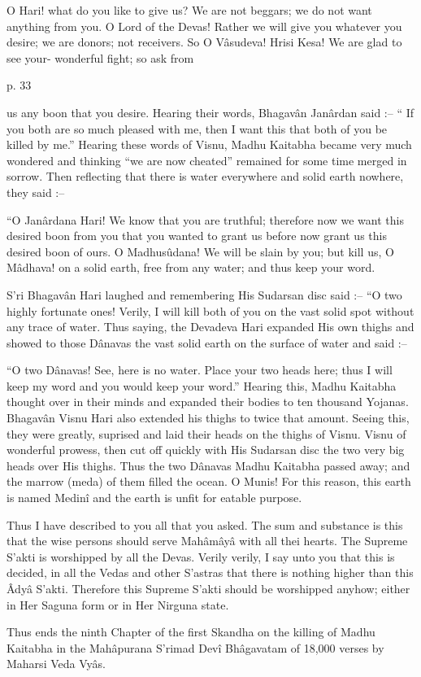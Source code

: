  

O Hari! what do you like to give us? We are not beggars; we do not want anything from you. O Lord of the Devas! Rather we will give you whatever you desire; we are donors; not receivers. So O Vâsudeva! Hrisi Kesa! We are glad to see your- wonderful fight; so ask from

 

p. 33

 

us any boon that you desire. Hearing their words, Bhagavân Janârdan said :-- “ If you both are so much pleased with me, then I want this that both of you be killed by me.” Hearing these words of Visnu, Madhu Kaitabha became very much wondered and thinking “we are now cheated” remained for some time merged in sorrow. Then reflecting that there is water everywhere and solid earth nowhere, they said :--

 

“O Janârdana Hari! We know that you are truthful; therefore now we want this desired boon from you that you wanted to grant us before now grant us this desired boon of ours. O Madhusûdana! We will be slain by you; but kill us, O Mâdhava! on a solid earth, free from any water; and thus keep your word.

 

S’ri Bhagavân Hari laughed and remembering His Sudarsan disc said :-- “O two highly fortunate ones! Verily, I will kill both of you on the vast solid spot without any trace of water. Thus saying, the Devadeva Hari expanded His own thighs and showed to those Dânavas the vast solid earth on the surface of water and said :--

 

“O two Dânavas! See, here is no water. Place your two heads here; thus I will keep my word and you would keep your word.” Hearing this, Madhu Kaitabha thought over in their minds and expanded their bodies to ten thousand Yojanas. Bhagavân Visnu Hari also extended his thighs to twice that amount. Seeing this, they were greatly, suprised and laid their heads on the thighs of Visnu. Visnu of wonderful prowess, then cut off quickly with His Sudarsan disc the two very big heads over His thighs. Thus the two Dânavas Madhu Kaitabha passed away; and the marrow (meda) of them filled the ocean. O Munis! For this reason, this earth is named Medinî and the earth is unfit for eatable purpose.

 

Thus I have described to you all that you asked. The sum and substance is this that the wise persons should serve Mahâmâyâ with all thei hearts. The Supreme S’akti is worshipped by all the Devas. Verily verily, I say unto you that this is decided, in all the Vedas and other S’astras that there is nothing higher than this Âdyâ S’akti. Therefore this Supreme S’akti should be worshipped anyhow; either in Her Saguna form or in Her Nirguna state.

 

Thus ends the ninth Chapter of the first Skandha on the killing of Madhu Kaitabha in the Mahâpurana S’rimad Devî Bhâgavatam of 18,000 verses by Maharsi Veda Vyâs.